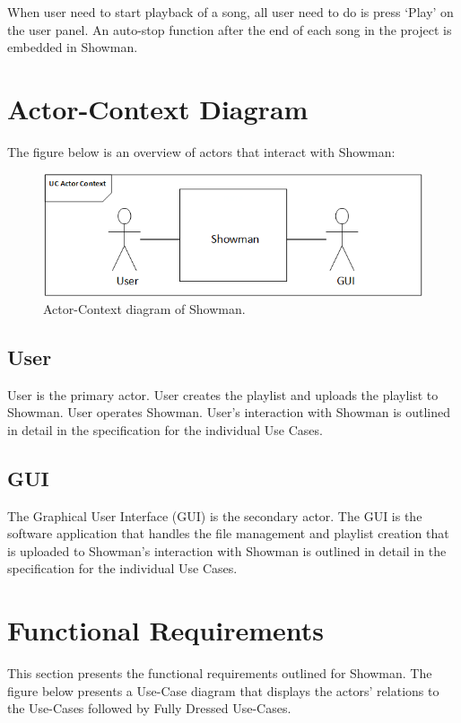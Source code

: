 When user need to start playback of a song, all user need to do is press `Play' on the user panel. An auto-stop function after the end of each song in the project is embedded in Showman. \newline

\section{Actor-Context Diagram}

The figure below is an overview of actors that interact with Showman:

\begin{figure}[htb!]
\centering
\includegraphics[scale=1]{./pictures/ActorContext.png}
\caption{Actor-Context diagram of Showman.}
\label{fig:ActorContext.png}
\end{figure}

\subsection{User}
User is the primary actor. User creates the playlist and uploads the playlist to Showman. User operates Showman. User's interaction with Showman is outlined in detail in the specification for the individual Use Cases. \newline

\subsection{GUI}
The Graphical User Interface (GUI) is the secondary actor. The GUI is the software application that handles the file management and playlist creation that is uploaded to Showman's interaction with Showman is outlined in detail in the specification for the individual Use Cases. \newline

\section{Functional Requirements}
This section presents the functional requirements outlined for Showman. The figure below presents a Use-Case diagram that displays the actors' relations to the Use-Cases followed by Fully Dressed Use-Cases. \newline

